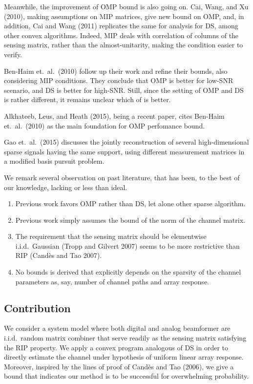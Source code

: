 Meanwhile, the improvement of OMP bound is also going on.
Cai, Wang, and Xu (2010), making assumptions on MIP matrices, give new bound on OMP, and, in addition, Cai and Wang (2011) replicates the same for analysis for DS, among other convex algorithms.
Indeed, MIP deals with correlation of columns of the sensing matrix, rather than the almost-unitarity, making the condition easier to verify.

Ben-Haim et.\ al.\ (2010) follow up their work and refine their bounds, also considering MIP conditions.
They conclude that OMP is better for low-SNR scenario, and DS is better for high-SNR.
Still, since the setting of OMP and DS is rather different, it remains unclear which of is better.

Alkhateeb, Leus, and Heath (2015), being a recent paper, cites Ben-Haim et.\ al.\ (2010) as the main foundation for OMP perfomance bound.

Gao et.\ al.\ (2015) discusses the jointly reconstruction of several high-dimensional sparse signals having the same support, using different measurement matrices in a modified basis pursuit problem.

We remark several observation on past literature, that has been, to the best of our knowledge, lacking or less than ideal.

\begin{enumerate}
\item Previous work favors OMP rather than DS, let alone other sparse algorithm.
\item Previous work simply assumes the bound of the norm of the channel matrix.
\item The requirement that the sensing matrix should be elementwise i.i.d.\ Gaussian (Tropp and Gilvert 2007) seems to be more restrictive than RIP (Cand\`es and Tao 2007).
\item No bounds is derived that explicitly depends on the sparsity of the channel parameters as, say, number of channel paths and array response.
\end{enumerate}

\subsection{Contribution}

We consider a system model where both digital and analog beamformer are i.i.d.\ random matrix combiner that serve readily as the sensing matrix satisfying the RIP property.
We apply a convex program analogous of DS in order to directly estimate the channel under hypothesis of uniform linear array response.
Moreover, inspired by the lines of proof of Cand\`es and Tao (2006), we give a bound that indicates our method is to be successful for overwhelming probability.

